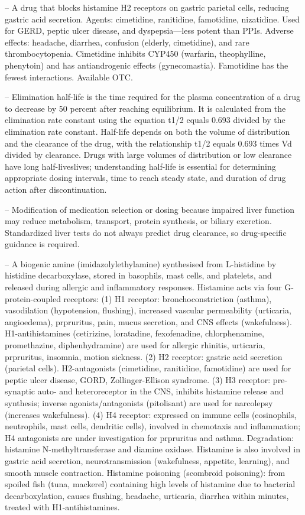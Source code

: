 -- A drug that blocks histamine H2 receptors on gastric parietal cells, reducing gastric acid secretion. Agents: cimetidine, ranitidine, famotidine, nizatidine. Used for GERD, peptic ulcer disease, and dyspepsia—less potent than PPIs. Adverse effects: headache, diarrhea, confusion (elderly, cimetidine), and rare thrombocytopenia. Cimetidine inhibits CYP450 (warfarin, theophylline, phenytoin) and has antiandrogenic effects (gynecomastia). Famotidine has the fewest interactions. Available OTC.

-- Elimination half-life is the time required for the plasma concentration of a drug to decrease by 50 percent after reaching equilibrium. It is calculated from the elimination rate constant using the equation t1/2 equals 0.693 divided by the elimination rate constant. Half-life depends on both the volume of distribution and the clearance of the drug, with the relationship t1/2 equals 0.693 times Vd divided by clearance. Drugs with large volumes of distribution or low clearance have long half-liveslives; understanding half-life is essential for determining appropriate dosing intervals, time to reach steady state, and duration of drug action after discontinuation.

-- Modification of medication selection or dosing because impaired liver function may reduce metabolism, transport, protein synthesis, or biliary excretion. Standardized liver tests do not always predict drug clearance, so drug-specific guidance is required.

-- A biogenic amine (imidazolylethylamine) synthesised from L-histidine by histidine decarboxylase, stored in basophils, mast cells, and platelets, and released during allergic and inflammatory responses. Histamine acts via four G-protein-coupled receptors: (1) H1 receptor: bronchoconstriction (asthma), vasodilation (hypotension, flushing), increased vascular permeability (urticaria, angioedema), prpruritus, pain, mucus secretion, and CNS effects (wakefulness). H1-antihistamines (cetirizine, loratadine, fexofenadine, chlorphenamine, promethazine, diphenhydramine) are used for allergic rhinitis, urticaria, prpruritus, insomnia, motion sickness. (2) H2 receptor: gastric acid secretion (parietal cells). H2-antagonists (cimetidine, ranitidine, famotidine) are used for peptic ulcer disease, GORD, Zollinger-Ellison syndrome. (3) H3 receptor: pre-synaptic auto- and heteroreceptor in the CNS, inhibits histamine release and synthesis; inverse agonists/antagonists (pitolisant) are used for narcolepsy (increases wakefulness). (4) H4 receptor: expressed on immune cells (eosinophils, neutrophils, mast cells, dendritic cells), involved in chemotaxis and inflammation; H4 antagonists are under investigation for prpruritus and asthma. Degradation: histamine N-methyltransferase and diamine oxidase. Histamine is also involved in gastric acid secretion, neurotransmission (wakefulness, appetite, learning), and smooth muscle contraction. Histamine poisoning (scombroid poisoning): from spoiled fish (tuna, mackerel) containing high levels of histamine due to bacterial decarboxylation, causes flushing, headache, urticaria, diarrhea within minutes, treated with H1-antihistamines.

